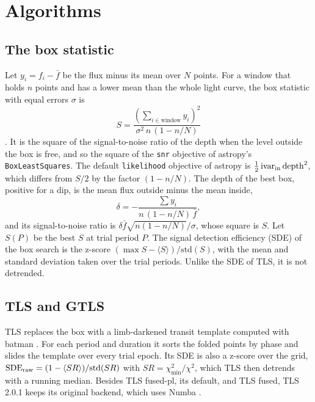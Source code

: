 \documentclass{aastex631}
\begin{document}
\section{Algorithms}\label{sec:algorithms}

\subsection{The box statistic}\label{sec:statistic}
Let $y_i = f_i - \bar f$ be the flux minus its mean over $N$ points. For a window that holds $n$ points and has a lower mean than the whole light curve, the box statistic with equal errors $\sigma$ is
\begin{equation}
S = \frac{\left(\sum_{i\in\text{window}} y_i\right)^2}{\sigma^2\, n\,(1 - n/N)}
\label{eq:statistic}
\end{equation}
\citep{Kovacs2002}. It is the square of the signal-to-noise ratio of the depth when the level outside the box is free, and so the square of the \texttt{snr} objective of astropy's \texttt{BoxLeastSquares}. The default \texttt{likelihood} objective of astropy is $\tfrac12\,\mathrm{ivar}_{\rm in}\,\mathrm{depth}^2$, which differs from $S/2$ by the factor $(1-n/N)$. The depth of the best box, positive for a dip, is the mean flux outside minus the mean inside,
\begin{equation}
\delta = -\frac{\sum y_i}{n\,(1-n/N)\,\bar f},
\end{equation}
and its signal-to-noise ratio is $\delta \bar f \sqrt{n(1-n/N)}/\sigma$, whose square is $S$. Let $S(P)$ be the best $S$ at trial period $P$. The signal detection efficiency (SDE) of the box search is the z-score $(\max S-\langle S\rangle)/\mathrm{std}(S)$, with the mean and standard deviation taken over the trial periods. Unlike the SDE of TLS, it is not detrended.

\subsection{TLS and GTLS}\label{sec:tls}
TLS replaces the box with a limb-darkened transit template computed with batman \citep{Kreidberg2015}. For each period and duration it sorts the folded points by phase and slides the template over every trial epoch. Its SDE is also a z-score over the grid, $\mathrm{SDE}_{\rm raw}=(1-\langle SR\rangle)/\mathrm{std}(SR)$ with $SR=\chi^2_{\min}/\chi^2$, which TLS then detrends with a running median. Besides TLS fused-pl, its default, and TLS fused, TLS 2.0.1 keeps its original backend, which uses Numba \citep{Lam2015}.
\end{document}
